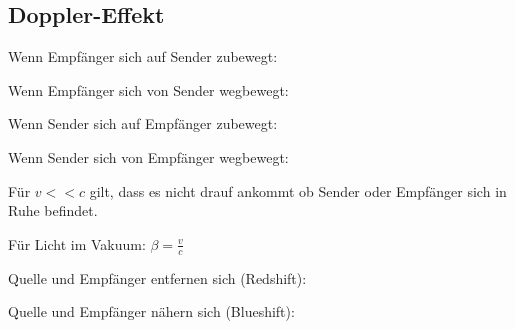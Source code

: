 \subsection{Doppler-Effekt}
    
    Wenn Empfänger sich auf Sender zubewegt:

    Wenn Empfänger sich von Sender wegbewegt:

    Wenn Sender sich auf Empfänger zubewegt:

    Wenn Sender sich von Empfänger wegbewegt:

    Für $v << c$ gilt, dass es nicht drauf ankommt ob Sender oder Empfänger sich in Ruhe befindet.

    Für Licht im Vakuum:
    $\beta = \frac{v}{c}$

    Quelle und Empfänger entfernen sich (Redshift):

    Quelle und Empfänger nähern sich (Blueshift):
